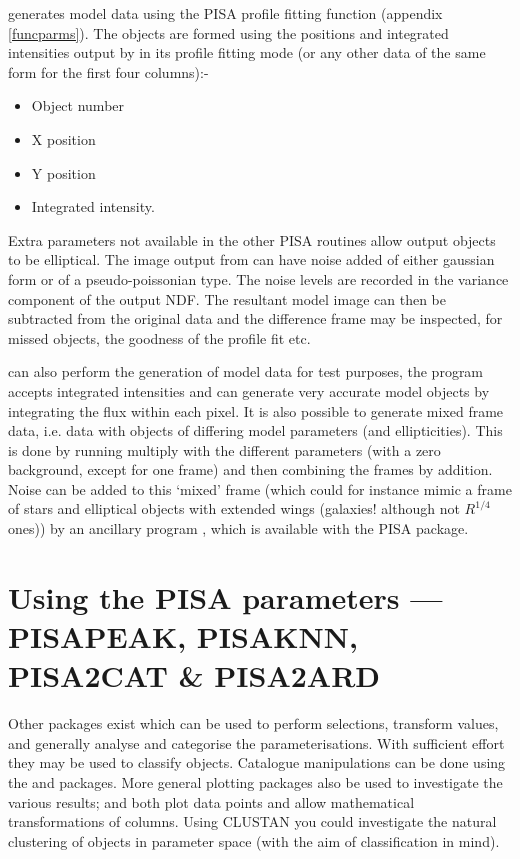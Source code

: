 generates model data using the PISA profile fitting function
(appendix \ref{funcparms}). The objects are formed using the positions
and integrated intensities output by  in its profile
fitting mode (or any other data of the same form for the first four
columns):-
\begin{itemize}
\item Object number
\item X position
\item Y position
\item Integrated intensity.
\end{itemize}
Extra parameters not available in the other PISA routines allow 
output objects to be elliptical. The image output from  can have
noise added of either gaussian form or of a pseudo-poissonian type. The
noise levels are recorded in the variance component of the output NDF.
The resultant model image can then be subtracted from the original data
and the difference frame may be inspected, for missed objects, the
goodness of the profile fit etc.

 can also perform the generation of model data for test purposes,
the program accepts integrated intensities and can generate very
accurate model objects by integrating the flux within each pixel. It is
also possible to generate mixed frame data, i.e. data with objects of
differing model parameters (and ellipticities). This is done by running
 multiply with the different parameters (with a zero background,
except for one frame) and then combining the frames by addition. Noise
can be added to this `mixed' frame (which could for instance mimic a
frame of stars and elliptical objects with extended wings (galaxies!
although not $R^{1/4}$ ones)) by an ancillary program , which is
available with the PISA package.

\section{\sloppy Using the PISA parameters --- PISAPEAK, PISAKNN, PISA2CAT \&
                 PISA2ARD}

Other packages exist which can be used to perform selections,
transform values, and generally analyse and categorise the
 parameterisations.
With sufficient effort they may be used to classify objects.
Catalogue manipulations can be done using the  and  packages.
More general plotting packages also be used to investigate the various
results;  and 
both plot data points and allow mathematical transformations of
columns.
Using CLUSTAN you could investigate the natural clustering of objects
in parameter space (with the aim of classification in mind).

